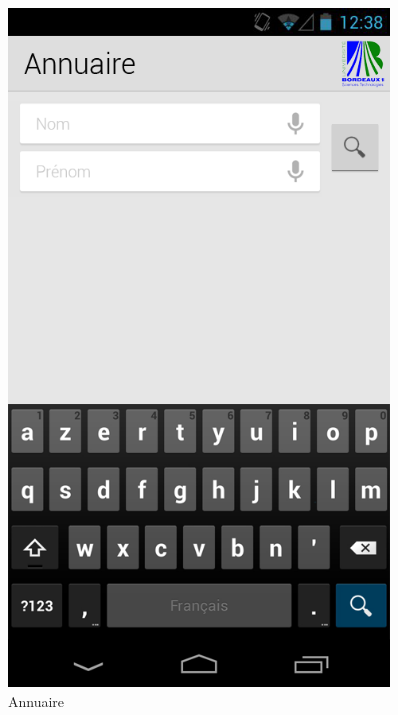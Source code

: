 \documentclass [pdftex,12pt] {report}
\begin{document}
\begin{figure}
  \begin{minipage}[t]{8cm}
    \centering
    \includegraphics[width=0.9\textwidth]{resources/ui_preview/05}
    \caption{Annuaire}
    \label{fig:05}
  \end{minipage}
  \begin{minipage}[t]{8cm}
    \centering

\end{minipage}
\end{figure}
\end{document}
